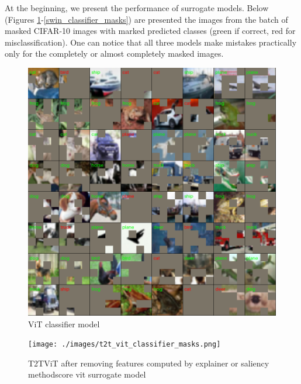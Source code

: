 \documentclass[magisterska,en]{pracamgr}
\begin{document}
At the beginning, we present the performance of surrogate models. Below (Figures \ref{vit_classifier_masks}-\ref{swin_classifier_masks}) are presented the images from the batch of masked CIFAR-10 images with marked predicted classes (green if correct, red for misclassification). One can notice that all three models make mistakes practically only for the completely or almost completely masked images.

\begin{figure}[H]
\centering
\includegraphics[scale=0.5]{./images/vit_classifier_masks.png}
\caption{ViT classifier model}
\label{vit_classifier_masks}
\end{figure}


\begin{figure}[H]
\centering
\texttt{[image: ./images/t2t\_vit\_classifier\_masks.png]}
\caption{T2T\textunderscore ViT after removing features computed by explainer or saliency methodscore vit surrogate model}
\label{t2t_vit_classifier_masks}
\end{figure}
\end{document}
